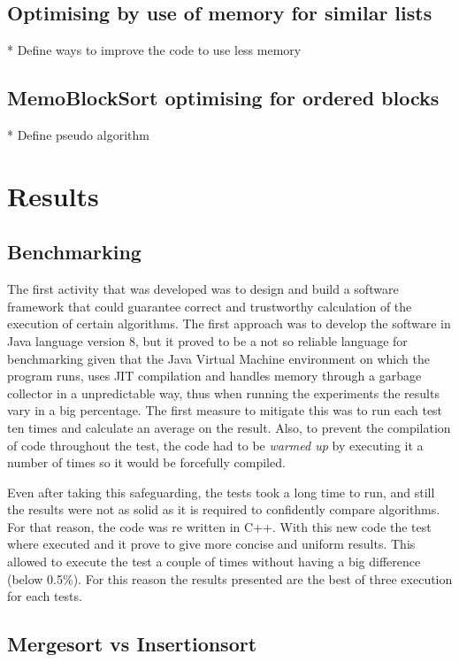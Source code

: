 \documentclass[a4paper,12pt]{article}
\begin{document}
\subsection{Optimising by use of memory for similar lists}
* Define ways to improve the code to use less memory

\subsection{MemoBlockSort optimising for ordered blocks}
* Define pseudo algorithm

\section{Results}
\subsection{Benchmarking}

The first activity that was developed was to design and build a software framework that could guarantee correct and trustworthy calculation of the execution of certain algorithms. The first approach was to develop the software in Java language version 8, but it proved to be a not so reliable language for benchmarking given that the Java Virtual Machine environment on which the program runs, uses JIT  compilation and handles memory through a garbage collector in a unpredictable way, thus when running the experiments the results vary in a big percentage. The first measure to mitigate this was to run each test ten times and calculate an average on the result. Also, to prevent the compilation of code throughout the test, the code had to be {\it warmed up} by executing it a number of times so it would be forcefully compiled. 

Even after taking this safeguarding, the tests took a long time to run, and still the results were not as solid as it is required to confidently compare algorithms. For that reason, the code was re written in C++. With this new code the test where  executed and it prove to give more concise and uniform results. This allowed to execute the test a couple of times without having a big difference (below 0.5\%). For this reason the results presented are the best of three execution for each tests.

\subsection{Mergesort vs Insertionsort}
\end{document}
